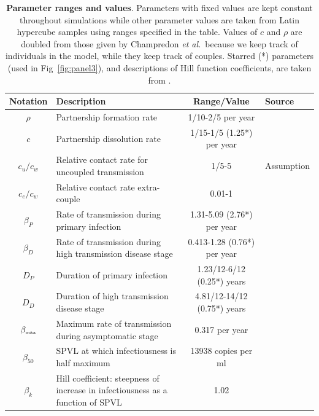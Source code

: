 \documentclass[10pt,letterpaper]{article}
\renewcommand{\figurename}{Fig}
\newcommand{\etal}{\textit{et al.}}
\newcommand{\tsub}[2]{#1_{{\textrm{\tiny #2}}}}
\begin{document}

\begin{table}[h!]
\caption{\textbf{Parameter ranges and values}. Parameters with fixed values are kept constant throughout simulations while other parameter values are taken from Latin hypercube samples using ranges specified in the table. Values of $c$ and $\rho$ are doubled from those given by Champredon \etal\ because we keep track of individuals in the model, while they keep track of couples. Starred (*) parameters (used in \figurename~\ref{fig:panel3}), and descriptions of Hill function coefficients, are taken from \cite{shirreff_transmission_2011}.}
\centering
\begin{tabular}{c p{2in} c l}
\hline 
Notation & Description & Range/Value & Source\\
\hline %
$\rho$ & Partnership formation rate & 1/10-2/5 per year & \cite{champredon_hiv_2013} \\
$c$ & Partnership dissolution rate & 1/15-1/5 (1.25*) per year & \cite{champredon_hiv_2013} \\
$c_u/c_w$ & Relative contact rate for uncoupled transmission & 1/5-5 & Assumption \\
$c_e/c_w$ & Relative contact rate extra-couple & 0.01-1 & \cite{champredon_hiv_2013} \\
$\beta_P$ & Rate of transmission during primary infection & 1.31-5.09 (2.76*) per year & \cite{hollingsworth_hiv1_2008} \\
$\beta_D$ & Rate of transmission during high transmission disease stage & 0.413-1.28 (0.76*) per year & \cite{hollingsworth_hiv1_2008} \\
$D_P$ & Duration of primary infection & 1.23/12-6/12 (0.25*) years & \cite{hollingsworth_hiv1_2008} \\
$D_D$ & Duration of high transmission disease stage & 4.81/12-14/12 (0.75*) years & \cite{hollingsworth_hiv1_2008} \\
$\tsub{\beta}{max}$ & Maximum rate of transmission during asymptomatic stage & 0.317 per year & \cite{shirreff_transmission_2011} \\
$\beta_{50}$ & SPVL at which infectiousness is half maximum & 13938 copies per ml & \cite{shirreff_transmission_2011} \\
$\beta_k$ & Hill coefficient: steepness of increase in infectiousness as a function of SPVL & 1.02 & \cite{shirreff_transmission_2011} \\

\end{tabular}
\end{table}
\end{document}
